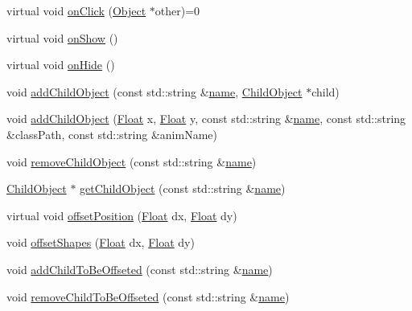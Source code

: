 \begin{DoxyCompactItemize}
\item 
virtual void \hyperlink{classZeta_1_1Object_a334f107411268cefd5d88a1ec40bb639}{on\+Click} (\hyperlink{classZeta_1_1Object}{Object} $\ast$other)=0
\item 
virtual void \hyperlink{classZeta_1_1Object_ad3abbbefc457b05de5205f5f9159f76e}{on\+Show} ()
\item 
virtual void \hyperlink{classZeta_1_1Object_a13813b4db4644d759b771ba25edf1d80}{on\+Hide} ()
\item 
void \hyperlink{classZeta_1_1Object_a2a198ba422c3303c91736b886a6b0890}{add\+Child\+Object} (const std\+::string \&\hyperlink{classZeta_1_1Object_ace4ef81b7c300e0a170292e9888cd66f}{name}, \hyperlink{classZeta_1_1ChildObject}{Child\+Object} $\ast$child)
\item 
void \hyperlink{classZeta_1_1Object_a6dee7bca619018bf6487d35a67f71e9c}{add\+Child\+Object} (\hyperlink{namespaceZeta_a1e0a1265f9b3bd3075fb0fabd39088ba}{Float} x, \hyperlink{namespaceZeta_a1e0a1265f9b3bd3075fb0fabd39088ba}{Float} y, const std\+::string \&\hyperlink{classZeta_1_1Object_ace4ef81b7c300e0a170292e9888cd66f}{name}, const std\+::string \&class\+Path, const std\+::string \&anim\+Name)
\item 
void \hyperlink{classZeta_1_1Object_a46fafb10165fe6de939ef65a3a7be67f}{remove\+Child\+Object} (const std\+::string \&\hyperlink{classZeta_1_1Object_ace4ef81b7c300e0a170292e9888cd66f}{name})
\item 
\hyperlink{classZeta_1_1ChildObject}{Child\+Object} $\ast$ \hyperlink{classZeta_1_1Object_aaaf9997e2d4e730f1cc4236ecc2743a4}{get\+Child\+Object} (const std\+::string \&\hyperlink{classZeta_1_1Object_ace4ef81b7c300e0a170292e9888cd66f}{name})
\item 
virtual void \hyperlink{classZeta_1_1Object_aa5c7489cba4d33f3ee45a742b1555ee0}{offset\+Position} (\hyperlink{namespaceZeta_a1e0a1265f9b3bd3075fb0fabd39088ba}{Float} dx, \hyperlink{namespaceZeta_a1e0a1265f9b3bd3075fb0fabd39088ba}{Float} dy)
\item 
void \hyperlink{classZeta_1_1Object_aa79360b5705302ce0e8b964b68ce1a2e}{offset\+Shapes} (\hyperlink{namespaceZeta_a1e0a1265f9b3bd3075fb0fabd39088ba}{Float} dx, \hyperlink{namespaceZeta_a1e0a1265f9b3bd3075fb0fabd39088ba}{Float} dy)
\item 
void \hyperlink{classZeta_1_1Object_aeecd5de95fcafde86b0fb1e80260b2e1}{add\+Child\+To\+Be\+Offseted} (const std\+::string \&\hyperlink{classZeta_1_1Object_ace4ef81b7c300e0a170292e9888cd66f}{name})
\item 
void \hyperlink{classZeta_1_1Object_ad12dd49fa2eac033513634beeb5024e6}{remove\+Child\+To\+Be\+Offseted} (const std\+::string \&\hyperlink{classZeta_1_1Object_ace4ef81b7c300e0a170292e9888cd66f}{name})

\end{DoxyCompactItemize}
